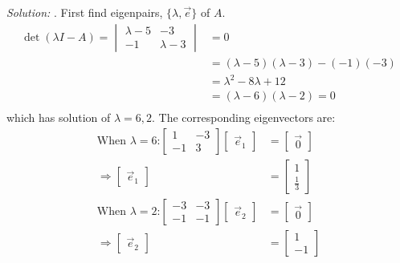 \documentclass[11pt]{homework}
\begin{document}
\emph{Solution:}
. First find eigenpairs, $\{\lambda,\vec e\}$ of $A$.
\begin{align*}
\det (\lambda I - A) = 
  \begin{vmatrix}
  \lambda -5 & -3 \\
  -1         & \lambda - 3
  \end{vmatrix}
  &= 0 \\
  &= (\lambda -5)(\lambda - 3) - (-1)(-3) \\
  &= \lambda^2 - 8 \lambda + 12 \\
  &= (\lambda-6)(\lambda-2) =0  \\
\end{align*}
which has solution of $\lambda = 6,2$.
The corresponding eigenvectors are:
\begin{align*}
\text{When $\lambda=6$:}
  \begin{bmatrix}
  1 & -3 \\
  -1         & 3
  \end{bmatrix}
  \begin{bmatrix}
    \vec e_1
  \end{bmatrix}
  &=
  \begin{bmatrix}
    \vec 0
  \end{bmatrix} \\
  \Rightarrow
  \begin{bmatrix}
    \vec e_1
  \end{bmatrix}
  &=
  \begin{bmatrix}
  1 \\
  \frac{1}{3}
  \end{bmatrix} \\
\text{When $\lambda=2$:}
  \begin{bmatrix}
  -3 & -3 \\
  -1         & -1
  \end{bmatrix}
  \begin{bmatrix}
    \vec e_2
  \end{bmatrix}
  &=
  \begin{bmatrix}
    \vec 0
  \end{bmatrix} \\
  \Rightarrow
  \begin{bmatrix}
    \vec e_2
  \end{bmatrix}
  &=
  \begin{bmatrix}
  1 \\
  -1
  \end{bmatrix}
\end{align*}
\end{document}

